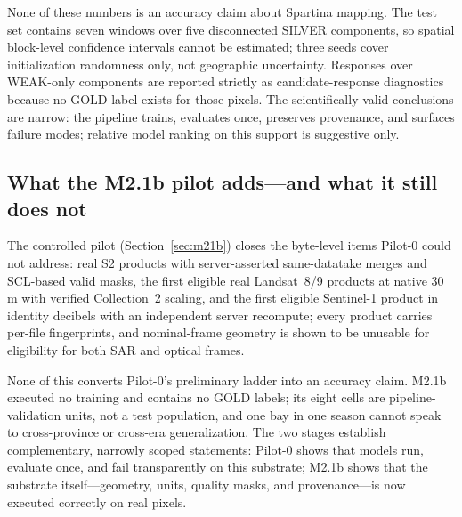 None of these numbers is an accuracy claim about Spartina mapping. The
test set contains seven windows over five disconnected SILVER
components, so spatial block-level confidence intervals cannot be
estimated; three seeds cover initialization randomness only, not
geographic uncertainty. Responses over WEAK-only components are
reported strictly as candidate-response diagnostics because no GOLD
label exists for those pixels. The scientifically valid conclusions are
narrow: the pipeline trains, evaluates once, preserves provenance, and
surfaces failure modes; relative model ranking on this support is
suggestive only.

\begin{figure}[t]\centering
{}
\label{fig:pilot0}
\end{figure}

\subsection{What the M2.1b pilot adds---and what it still does not}
The controlled pilot (Section~\ref{sec:m21b}) closes the byte-level
items Pilot-0 could not address: real S2 products with server-asserted
same-datatake merges and SCL-based valid masks, the first eligible
real Landsat~8/9 products at native 30\,m with verified Collection~2
scaling, and the first eligible Sentinel-1 product in identity
decibels with an independent server recompute; every product carries
per-file fingerprints, and nominal-frame geometry is shown to be
unusable for eligibility for both SAR and optical frames.

None of this converts Pilot-0's preliminary ladder into an accuracy
claim. M2.1b executed no training and contains no GOLD labels; its
eight cells are pipeline-validation units, not a test population, and
one bay in one season cannot speak to cross-province or cross-era
generalization. The two stages establish complementary, narrowly
scoped statements: Pilot-0 shows that models run, evaluate once, and
fail transparently on this substrate; M2.1b shows that the substrate
itself---geometry, units, quality masks, and provenance---is now
executed correctly on real pixels.
